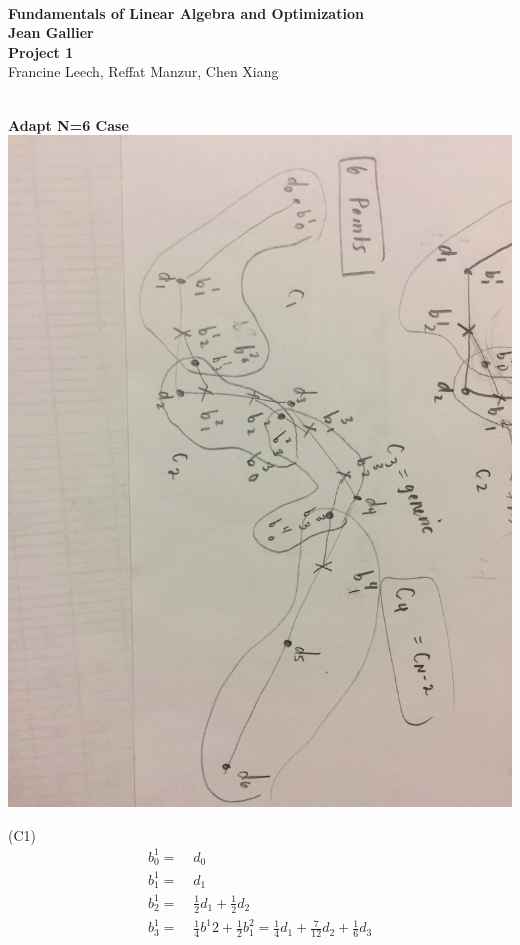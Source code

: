 \documentclass[12pt]{article}
\begin{document}
\begin{center}
\\
\vspace{1cm}
{\Large\bf Fundamentals of Linear Algebra and Optimization\\
Jean Gallier \\
\vspace{0.5cm}
Project 1}\\[10pt]
Francine Leech, Reffat Manzur, Chen Xiang 

\end{center}

\\
\vspace {0.25cm}\noindent
{\bf Adapt N=6 Case} \\

\includegraphics[scale=.1]{6Points}

(C1)
\begin{align*}
b^{1}_{0} =&\; d_0 \\
b^{1}_{1} =&\; d_1 \\
b^{1}_{2} =&\; \frac{1}{2} d_1 + \frac{1}{2}d_2 \\
b^{1}_{3} =&\; \frac{1}{4} b^{1}{2} + \frac{1}{2} b^{2}_{1} =\frac{1}{4}d_1 +\frac{7}{12}d_2 + \frac{1}{6}d_3 \\
\end{align*}
\end{document}
